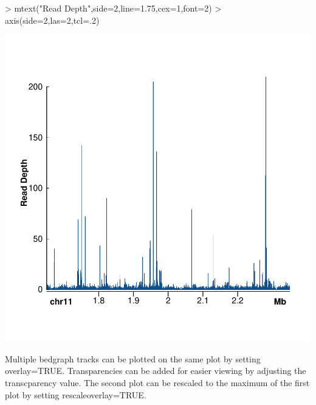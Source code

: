 \documentclass{article}
\begin{document}
\begin{center}

\begin{Schunk}
\begin{Sinput}
> mtext("Read Depth",side=2,line=1.75,cex=1,font=2)
> axis(side=2,las=2,tcl=.2)
\end{Sinput}
\end{Schunk}

\includegraphics{Sushi-009}
\end{center}

Multiple bedgraph tracks can be plotted on the same plot by setting overlay=TRUE.  Transparencies can be added for easier viewing by adjusting the transcparency value.  The second plot can be rescaled to the maximum of the first plot by setting rescaleoverlay=TRUE.
\end{document}
